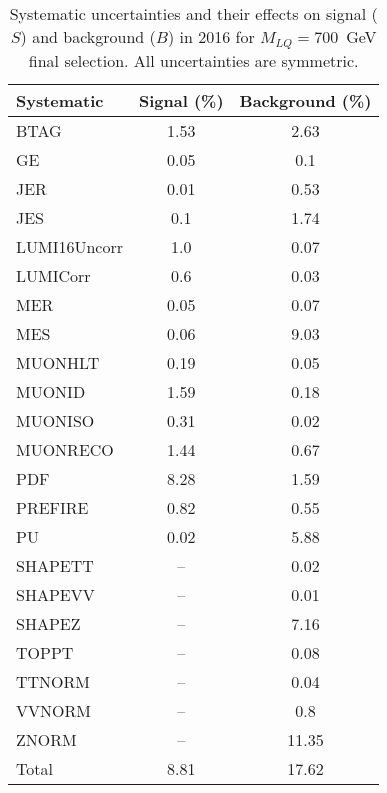 \begin{table}[htbp]
\begin{center}
\caption{Systematic uncertainties and their effects on signal ($S$) and background ($B$) in 2016 for $M_{LQ}=700$~GeV final selection. All uncertainties are symmetric.}
\begin{tabular}{lcc}
\hline\hline
Systematic & Signal (\%) & Background (\%) \\ \hline 
BTAG & 1.53 & 2.63\\ 
GE & 0.05 & 0.1\\ 
JER & 0.01 & 0.53\\ 
JES & 0.1 & 1.74\\ 
LUMI16Uncorr & 1.0 & 0.07\\ 
LUMICorr & 0.6 & 0.03\\ 
MER & 0.05 & 0.07\\ 
MES & 0.06 & 9.03\\ 
MUONHLT & 0.19 & 0.05\\ 
MUONID & 1.59 & 0.18\\ 
MUONISO & 0.31 & 0.02\\ 
MUONRECO & 1.44 & 0.67\\ 
PDF & 8.28 & 1.59\\ 
PREFIRE & 0.82 & 0.55\\ 
PU & 0.02 & 5.88\\ 
SHAPETT & -- & 0.02\\ 
SHAPEVV & -- & 0.01\\ 
SHAPEZ & -- & 7.16\\ 
TOPPT & -- & 0.08\\ 
TTNORM & -- & 0.04\\ 
VVNORM & -- & 0.8\\ 
ZNORM & -- & 11.35\\ 
Total & 8.81 & 17.62\\ \hline \hline
\end{tabular}
\label{tab:SysUncertainties_uujj_700}
\end{center}
\end{table}

